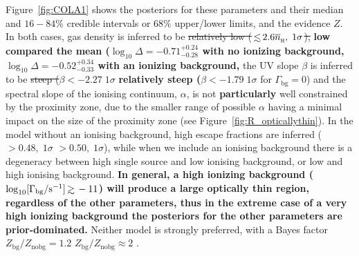 \documentclass[fleqn,usenatbib]{mnras}
\providecommand{\DIFadd}[1]{{\protect\color{Green} \bf #1}} %
\providecommand{\DIFdel}[1]{{\protect\color{lightgray} \footnotesize \sout{#1}}} %
\providecommand{\DIFaddbegin}{} %
\providecommand{\DIFaddend}{} %
\providecommand{\DIFdelbegin}{} %
\providecommand{\DIFdelend}{} %
\newcommand{\DIFscaledelfig}{0.5}
\newlength{\DIFdelgraphicswidth} %
\newlength{\DIFdelgraphicsheight} %
\newcommand{\DIFaddincludegraphics}[2][]{{\color{blue}\fbox{\DIFOincludegraphics[#1]{#2}}}} %
\newcommand{\DIFdelincludegraphics}[2][]{%
\sbox{\DIFdelgraphicsbox}{\DIFOincludegraphics[#1]{#2}}%
\settoboxwidth{\DIFdelgraphicswidth}{\DIFdelgraphicsbox} %
\settoboxtotalheight{\DIFdelgraphicsheight}{\DIFdelgraphicsbox} %
\scalebox{\DIFscaledelfig}{%
\parbox[b]{\DIFdelgraphicswidth}{\usebox{\DIFdelgraphicsbox}\\[-\baselineskip] \rule{\DIFdelgraphicswidth}{0em}}\llap{\resizebox{\DIFdelgraphicswidth}{\DIFdelgraphicsheight}{%
\setlength{\unitlength}{\DIFdelgraphicswidth}%
\begin{picture}(1,1)%
\thicklines\linethickness{2pt} %
{\color[rgb]{1,0,0}\put(0,0){\framebox(1,1){}}}%
{\color[rgb]{1,0,0}\put(0,0){\line( 1,1){1}}}%
{\color[rgb]{1,0,0}\put(0,1){\line(1,-1){1}}}%
\end{picture}%
}\hspace*{3pt}}} %
} %
\DeclareRobustCommand{\DIFaddbegin}{\DIFOaddbegin \let\includegraphics\DIFaddincludegraphics} %
\DeclareRobustCommand{\DIFaddend}{\DIFOaddend \let\includegraphics\DIFOincludegraphics} %
\DeclareRobustCommand{\DIFdelbegin}{\DIFOdelbegin \let\includegraphics\DIFdelincludegraphics} %
\DeclareRobustCommand{\DIFdelend}{\DIFOaddend \let\includegraphics\DIFOincludegraphics} %
\begin{document}
Figure~\ref{fig:COLA1} shows the posteriors for these parameters and their median and $16-84\%$ credible intervals or $68\%$ upper/lower limits, and the evidence $Z$. In both cases, gas density is inferred to be \DIFdelbegin \DIFdel{relatively low ($\simlt2.6\nh, \; 1\sigma$), }\DIFdelend \DIFaddbegin \DIFadd{low compared the mean ($\log_{10} \Delta = -0.71_{-0.28}^{+0.24}$ with no ionizing background, $\log_{10} \Delta = -0.52_{-0.33}^{+0.34}$ with an ionizing background, }\DIFaddend the UV slope $\beta$ is inferred to be \DIFdelbegin \DIFdel{steep ($\beta < -2.27 \; 1\sigma$ }\DIFdelend \DIFaddbegin \DIFadd{relatively steep ($\beta < -1.79 \; 1\sigma$ }\DIFaddend for $\Gamma_\mathrm{bg} = 0$) and the spectral slope of the ionising continuum, $\alpha$, is not \DIFaddbegin \DIFadd{particularly }\DIFaddend well constrained by the proximity zone, due to the smaller range of possible $\alpha$ having a minimal impact on the size of the proximity zone (see Figure~\ref{fig:R_opticallythin}). In the model without an ionising background, high escape fractions are inferred (\DIFdelbegin \DIFdel{$>0.48, \; 1\sigma$}\DIFdelend \DIFaddbegin \DIFadd{$>0.50, \; 1\sigma$}\DIFaddend ), while when we include an ionising background there is a degeneracy between high single source \fesc and low ionising background, or low \fesc and high ionising background. \DIFaddbegin \DIFadd{In general, a high ionizing background ($\log_{10}[\Gamma_\mathrm{bg}/\mathrm{s}^{-1}] \simgt -11$) will produce a large optically thin region, regardless of the other parameters, thus in the extreme case of a very high ionizing background the posteriors for the other parameters are prior-dominated. }\DIFaddend Neither model is strongly preferred, with a Bayes factor \DIFdelbegin \DIFdel{$Z_\mathrm{bg}/Z_\mathrm{no bg} = 1.2$ }\DIFdelend \DIFaddbegin \DIFadd{$Z_\mathrm{bg}/Z_\mathrm{no bg} \approx 2$ }\DIFaddend \citep[e.g.,][]{Trotta2008}.
\end{document}
